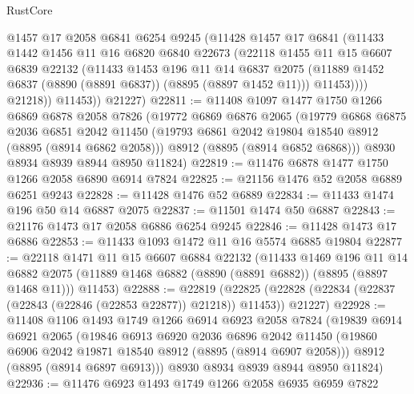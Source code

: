 \begin{lexlean}{RustCore}
\begin{coremodule}
              @1457
              @17
              @2058
              @6841
              @6254
              @9245
              (@11428
                @1457
                @17
                @6841
                (@11433
                  @1442
                  @1456
                  @11
                  @16
                  @6820
                  @6840
                  @22673
                  (@22118
                    @1455
                    @11
                    @15
                    @6607
                    @6839
                    @22132
                    (@11433
                      @1453
                      @196
                      @11
                      @14
                      @6837
                      @2075
                      (@11889 @1452 @6837 (@8890 (@8891 @6837)) (@8895 (@8897 @1452 @11)))
                      @11453))))
              @21218))
          @11453))
      @21227)
@22811 := @11408
    @1097
    @1477
    @1750
    @1266
    @6869
    @6878
    @2058
    @7826
    (@19772
      @6869
      @6876
      @2065
      (@19779
        @6868
        @6875
        @2036
        @6851
        @2042
        @11450
        (@19793 @6861 @2042 @19804 @18540 @8912 (@8895 (@8914 @6862 @2058)))
        @8912
        (@8895 (@8914 @6852 @6868)))
      @8930
      @8934
      @8939
      @8944
      @8950
      @11824)
@22819 := @11476 @6878 @1477 @1750 @1266 @2058 @6890 @6914 @7824
@22825 := @21156 @1476 @52 @2058 @6889 @6251 @9243
@22828 := @11428 @1476 @52 @6889
@22834 := @11433 @1474 @196 @50 @14 @6887 @2075
@22837 := @11501 @1474 @50 @6887
@22843 := @21176 @1473 @17 @2058 @6886 @6254 @9245
@22846 := @11428 @1473 @17 @6886
@22853 := @11433 @1093 @1472 @11 @16 @5574 @6885 @19804
@22877 := @22118
    @1471
    @11
    @15
    @6607
    @6884
    @22132
    (@11433
      @1469
      @196
      @11
      @14
      @6882
      @2075
      (@11889 @1468 @6882 (@8890 (@8891 @6882)) (@8895 (@8897 @1468 @11)))
      @11453)
@22888 := @22819
    (@22825 (@22828 (@22834 (@22837 (@22843 (@22846 (@22853 @22877)) @21218)) @11453)) @21227)
@22928 := @11408
    @1106
    @1493
    @1749
    @1266
    @6914
    @6923
    @2058
    @7824
    (@19839
      @6914
      @6921
      @2065
      (@19846
        @6913
        @6920
        @2036
        @6896
        @2042
        @11450
        (@19860 @6906 @2042 @19871 @18540 @8912 (@8895 (@8914 @6907 @2058)))
        @8912
        (@8895 (@8914 @6897 @6913)))
      @8930
      @8934
      @8939
      @8944
      @8950
      @11824)
@22936 := @11476 @6923 @1493 @1749 @1266 @2058 @6935 @6959 @7822

\end{coremodule}
\end{lexlean}
